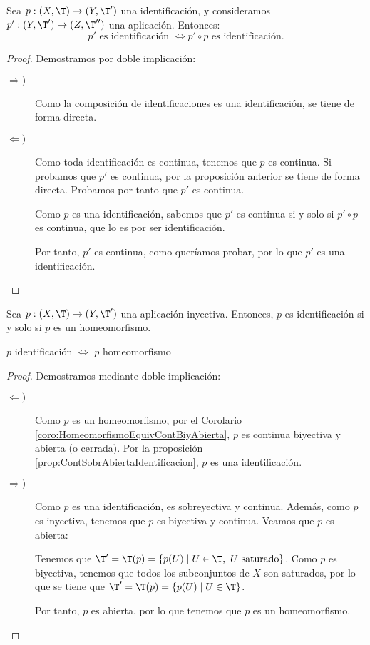 \begin{prop}
    Sea $p:(X,\T)\to (Y,\T')$ una identificación, y consideramos $p':(Y,\T')\to (Z,\T'')$ una aplicación. Entonces:
    \begin{equation*}
        p' \text{ es identificación }\Longleftrightarrow p'\circ p \text{ es identificación.}
    \end{equation*}
\end{prop}
\begin{proof} Demostramos por doble implicación:
\begin{description}
    \item[$\Longrightarrow)$] Como la composición de identificaciones es una identificación, se tiene de forma directa.

    \item[$\Longleftarrow)$] Como toda identificación es continua, tenemos que $p$ es continua. Si probamos que $p'$ es continua, por la proposición anterior se tiene de forma directa. Probamos por tanto que $p'$ es continua.

    Como $p$ es una identificación, sabemos que $p'$ es continua si y solo si $p'\circ p$ es continua, que lo es por ser identificación.

    Por tanto, $p'$ es continua, como queríamos probar, por lo que $p'$ es una identificación.
\end{description}
\end{proof}

\begin{prop}
    Sea $p:(X,\T)\to (Y,\T')$ una aplicación inyectiva. Entonces, $p$ es identificación si y solo si $p$ es un homeomorfismo.
    \begin{center}
        $p$ identificación $\Longleftrightarrow$ $p$ homeomorfismo
    \end{center}
\end{prop}
\begin{proof} Demostramos mediante doble implicación:
    \begin{description}
        \item[$\Longleftarrow)$] Como $p$ es un homeomorfismo, por el Corolario \ref{coro:HomeomorfismoEquivContBiyAbierta}, $p$ es continua biyectiva y abierta (o cerrada). Por la proposición \ref{prop:ContSobrAbiertaIdentificacion}, $p$ es una identificación. 

        \item[$\Longrightarrow)$] Como $p$ es una identificación, es sobreyectiva y continua. Además, como $p$ es inyectiva, tenemos que $p$ es biyectiva y continua. Veamos que $p$ es abierta:

        Tenemos que $\T'=\T(p) = \{p(U)\mid U\in \T,~ U\text{ saturado}\}$. Como $p$ es biyectiva, tenemos que todos los subconjuntos de $X$ son saturados, por lo que se tiene que $\T'=\T(p) = \{p(U)\mid U\in \T\}$.

        Por tanto, $p$ es abierta, por lo que tenemos que $p$ es un homeomorfismo.
    \end{description}
\end{proof}

